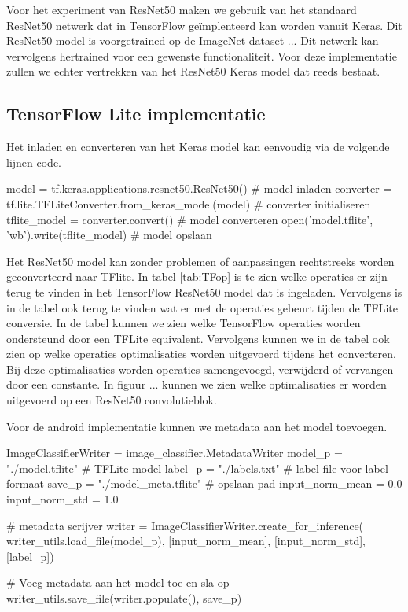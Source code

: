 Voor het experiment van ResNet50 maken we gebruik van het standaard ResNet50 netwerk dat in TensorFlow ge\"implenteerd kan worden vanuit Keras.
Dit ResNet50 model is voorgetrained op de ImageNet dataset ... 
Dit netwerk kan vervolgens hertrained voor een gewenste functionaliteit.
Voor deze implementatie zullen we echter vertrekken van het ResNet50 Keras model dat reeds bestaat.

\subsection{TensorFlow Lite implementatie}
Het inladen en converteren van het Keras model kan eenvoudig via de volgende lijnen code.

\begin{python}
model = tf.keras.applications.resnet50.ResNet50() # model inladen
converter = tf.lite.TFLiteConverter.from_keras_model(model) # converter initialiseren
tflite_model = converter.convert() # model converteren
open('model.tflite', 'wb').write(tflite_model) # model opslaan
\end{python}

Het ResNet50 model kan zonder problemen of aanpassingen rechtstreeks worden geconverteerd naar TFlite.
In tabel \ref{tab:TFop} is te zien welke operaties er zijn terug te vinden in het TensorFlow ResNet50 model dat is ingeladen.
Vervolgens is in de tabel ook terug te vinden wat er met de operaties gebeurt tijden de TFLite conversie.
In de tabel kunnen we zien welke TensorFlow operaties worden ondersteund door een TFLite equivalent.
Vervolgens kunnen we in de tabel ook zien op welke operaties optimalisaties worden uitgevoerd tijdens het converteren.
Bij deze optimalisaties worden operaties samengevoegd, verwijderd of vervangen door een constante.
In figuur ... kunnen we zien welke optimalisaties er worden uitgevoerd op een ResNet50 convolutieblok.

Voor de android implementatie kunnen we metadata aan het model toevoegen.
\begin{python} 
ImageClassifierWriter = image_classifier.MetadataWriter
model_p = "./model.tflite" # TFLite model
label_p = "./labels.txt" # label file voor label formaat
save_p = "./model_meta.tflite" # opslaan pad
input_norm_mean = 0.0
input_norm_std = 1.0
    
# metadata scrijver
writer = ImageClassifierWriter.create_for_inference(
    writer_utils.load_file(model_p), [input_norm_mean], [input_norm_std],
    [label_p])
    
# Voeg metadata aan het model toe en sla op
writer_utils.save_file(writer.populate(), save_p)
\end{python}

